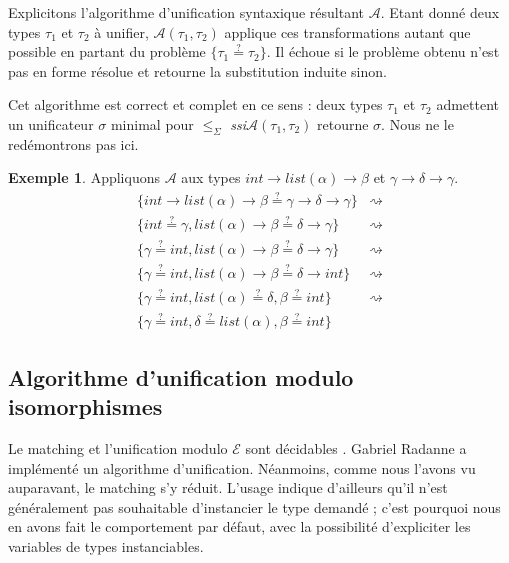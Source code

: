 \documentclass[a4paper]{report}
\theoremstyle{definition}
\newtheorem{exemple}[theoreme]{Exemple}
\newcommand{\qeq}{\stackrel {\scriptscriptstyle ?} =}
\newcommand{\ssi}{\textit{ssi}\xspace}
\newcommand{\E}{\mathscr{E}}
\begin{document}
Explicitons l'algorithme d'unification syntaxique résultant $\mathscr{A}$. Etant donné deux types $\tau_1$ et $\tau_2$ à unifier, $\mathscr{A} (\tau_1, \tau_2)$ applique ces transformations autant que possible en partant du problème $\{ \tau_1 \qeq \tau_2 \}$. Il échoue si le problème obtenu n'est pas en forme résolue et retourne la substitution induite sinon.

Cet algorithme est correct et complet en ce sens : deux types $\tau_1$ et $\tau_2$ admettent un unificateur $\sigma$ minimal pour $\leqslant_\Sigma$ \ssi $\mathscr{A} (\tau_1, \tau_2)$ retourne $\sigma$. Nous ne le redémontrons pas ici.

\begin{exemple}
	Appliquons $\mathscr{A}$ aux types $int \rightarrow list (\alpha) \rightarrow \beta$ et $\gamma \rightarrow \delta \rightarrow \gamma$.
	\begin{align}
			\{ int \rightarrow list (\alpha) \rightarrow \beta \qeq \gamma \rightarrow \delta \rightarrow \gamma \} &\rightsquigarrow
			\tag{decomposer-$\rightarrow$}
		\\
			\{ int \qeq \gamma, list (\alpha) \rightarrow \beta \qeq \delta \rightarrow \gamma \} &\rightsquigarrow
			\tag{orienter}
		\\
			\{ \gamma \qeq int, list (\alpha) \rightarrow \beta \qeq \delta \rightarrow \gamma \} &\rightsquigarrow
			\tag{substituer}
		\\
			\{ \gamma \qeq int, list (\alpha) \rightarrow \beta \qeq \delta \rightarrow int \} &\rightsquigarrow
			\tag{décomposer-$\rightarrow$}
		\\
			\{ \gamma \qeq int, list (\alpha) \qeq \delta, \beta \qeq int \} &\rightsquigarrow
			\tag{orienter}
		\\
			\{ \gamma \qeq int, \delta \qeq list (\alpha), \beta \qeq int \}
			\tag*{en forme résolue}
	\end{align}
\end{exemple}


\subsection{Algorithme d'unification modulo isomorphismes}

Le matching et l'unification modulo $\E$ sont décidables \cite{Narendran_Pfenning_Statman}. Gabriel Radanne a implémenté un algorithme d'unification. Néanmoins, comme nous l'avons vu auparavant, le matching s'y réduit. L'usage indique d'ailleurs qu'il n'est généralement pas souhaitable d'instancier le type demandé ; c'est pourquoi nous en avons fait le comportement par défaut, avec la possibilité d'expliciter les variables de types instanciables.
\end{document}

